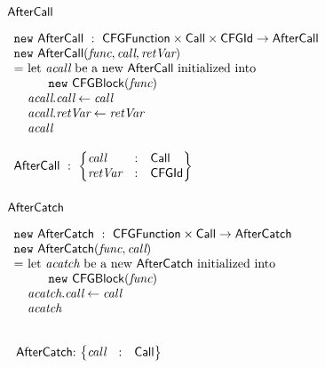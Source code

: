 \subsubsection{$\mbox{\textsf{AfterCall}}$}
$
\begin{array}{l@{}l@{~}l}
\lefteqn{\new \ \AfterCall \ : \ \CFGFunction \times \Call \times \CFGId \rightarrow \AfterCall} \\
\lefteqn{\new\ \AfterCall(\emph{func}, \emph{call}, \emph{retVar})}\\
& = & \text{let } \emph{acall} \text{ be a new } \AfterCall \text{ initialized into}\\
&& \quad\ \ \new\ \CFGBlock(\emph{func})\\
& & \emph{acall}.\emph{call} \leftarrow \emph{call}\\
& & \emph{acall}.\emph{retVar} \leftarrow \emph{retVar}\\
& & \emph{acall}\\\\
\lefteqn{\AfterCall \ : \
\begin{Bmatrix*}[l]
\emph{call} & : & \Call \\
\emph{retVar} & : & \CFGId \\
\end{Bmatrix*}}
\end{array}
$

\subsubsection{$\mbox{\textsf{AfterCatch}}$}
$
\begin{array}{l@{}l@{~}l}
\lefteqn{\new \ \AfterCatch \ : \ \CFGFunction \times \Call \rightarrow \AfterCatch}\\
\lefteqn{\new\ \AfterCatch(\emph{func}, \emph{call})}\\
& = & \text{let } \emph{acatch} \text{ be a new } \AfterCatch \text{ initialized into }\\
& & \quad\ \ \new\ \CFGBlock(\emph{func})\\
& & \emph{acatch}.\emph{call} \leftarrow \emph{call}\\
& & \emph{acatch}\\
\end{array}
$

\noindent
$
\begin{array}{@{~}r@{~}l@{}l@{~}l}
\\
& \AfterCatch & : &
\begin{Bmatrix*}[l]
\emph{call} & : & \Call \\
\end{Bmatrix*}\\
\end{array}
$


